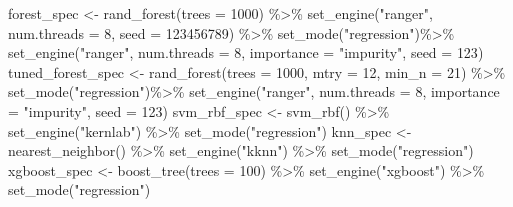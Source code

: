 \documentclass[
]{article}
\newenvironment{Shaded}{\begin{snugshade}}{\end{snugshade}}
\newcommand{\AttributeTok}[1]{\textcolor[rgb]{0.77,0.63,0.00}{#1}}
\newcommand{\DecValTok}[1]{\textcolor[rgb]{0.00,0.00,0.81}{#1}}
\newcommand{\FunctionTok}[1]{\textcolor[rgb]{0.00,0.00,0.00}{#1}}
\newcommand{\NormalTok}[1]{#1}
\newcommand{\OtherTok}[1]{\textcolor[rgb]{0.56,0.35,0.01}{#1}}
\newcommand{\SpecialCharTok}[1]{\textcolor[rgb]{0.00,0.00,0.00}{#1}}
\newcommand{\StringTok}[1]{\textcolor[rgb]{0.31,0.60,0.02}{#1}}
\begin{document}
\begin{Shaded}
\begin{Highlighting}[]
\NormalTok{forest\_spec }\OtherTok{\textless{}{-}}
  \FunctionTok{rand\_forest}\NormalTok{(}\AttributeTok{trees =} \DecValTok{1000}\NormalTok{) }\SpecialCharTok{\%\textgreater{}\%}
  \FunctionTok{set\_engine}\NormalTok{(}\StringTok{"ranger"}\NormalTok{, }\AttributeTok{num.threads =} \DecValTok{8}\NormalTok{, }\AttributeTok{seed =} \DecValTok{123456789}\NormalTok{) }\SpecialCharTok{\%\textgreater{}\%}
  \FunctionTok{set\_mode}\NormalTok{(}\StringTok{"regression"}\NormalTok{)}\SpecialCharTok{\%\textgreater{}\%}
  \FunctionTok{set\_engine}\NormalTok{(}\StringTok{"ranger"}\NormalTok{, }\AttributeTok{num.threads =} \DecValTok{8}\NormalTok{, }\AttributeTok{importance =} \StringTok{"impurity"}\NormalTok{, }\AttributeTok{seed =} \DecValTok{123}\NormalTok{)}
\NormalTok{tuned\_forest\_spec }\OtherTok{\textless{}{-}}
  \FunctionTok{rand\_forest}\NormalTok{(}\AttributeTok{trees =} \DecValTok{1000}\NormalTok{, }\AttributeTok{mtry =} \DecValTok{12}\NormalTok{, }\AttributeTok{min\_n =} \DecValTok{21}\NormalTok{) }\SpecialCharTok{\%\textgreater{}\%}
  \FunctionTok{set\_mode}\NormalTok{(}\StringTok{"regression"}\NormalTok{)}\SpecialCharTok{\%\textgreater{}\%}
  \FunctionTok{set\_engine}\NormalTok{(}\StringTok{"ranger"}\NormalTok{, }\AttributeTok{num.threads =} \DecValTok{8}\NormalTok{, }\AttributeTok{importance =} \StringTok{"impurity"}\NormalTok{, }\AttributeTok{seed =} \DecValTok{123}\NormalTok{)}
\NormalTok{svm\_rbf\_spec }\OtherTok{\textless{}{-}}
  \FunctionTok{svm\_rbf}\NormalTok{() }\SpecialCharTok{\%\textgreater{}\%}
  \FunctionTok{set\_engine}\NormalTok{(}\StringTok{"kernlab"}\NormalTok{) }\SpecialCharTok{\%\textgreater{}\%}
  \FunctionTok{set\_mode}\NormalTok{(}\StringTok{"regression"}\NormalTok{)}
\NormalTok{knn\_spec }\OtherTok{\textless{}{-}}
  \FunctionTok{nearest\_neighbor}\NormalTok{() }\SpecialCharTok{\%\textgreater{}\%}
  \FunctionTok{set\_engine}\NormalTok{(}\StringTok{"kknn"}\NormalTok{) }\SpecialCharTok{\%\textgreater{}\%}
  \FunctionTok{set\_mode}\NormalTok{(}\StringTok{"regression"}\NormalTok{)}
\NormalTok{xgboost\_spec }\OtherTok{\textless{}{-}}
  \FunctionTok{boost\_tree}\NormalTok{(}\AttributeTok{trees =} \DecValTok{100}\NormalTok{) }\SpecialCharTok{\%\textgreater{}\%}
  \FunctionTok{set\_engine}\NormalTok{(}\StringTok{"xgboost"}\NormalTok{) }\SpecialCharTok{\%\textgreater{}\%}
  \FunctionTok{set\_mode}\NormalTok{(}\StringTok{"regression"}\NormalTok{)}
\end{Highlighting}
\end{Shaded}
\end{document}
